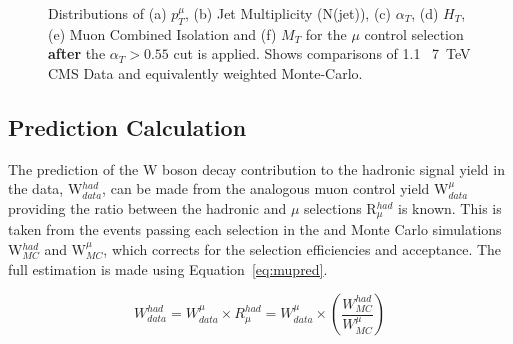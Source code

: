 \begin{figure}[htbp]
\begin{center}
\begin{minipage}[b]{1.\linewidth}
\end{minipage}
\caption{\label{fig:muonplots_afterat} Distributions of (a) $p_{T}^{\mu}$, (b) Jet Multiplicity (N(jet)), (c) $\alpha_{T}$, (d) $H_{T}$, (e) Muon Combined Isolation and (f) $M_{T}$ for the $\mu$ control selection \textbf{after} the $\alpha_{T} > 0.55$ cut is applied. Shows comparisons of 1.1~ 7~TeV CMS Data and equivalently weighted Monte-Carlo.}
\label{fig:kinafter}
\end{center}
\end{figure}
\subsection{Prediction Calculation}

The prediction of the W boson decay contribution to the hadronic signal yield in the data, W$^{had}_{data}$, can be made from the analogous muon control yield W$^{\mu}_{data}$ providing the ratio between the hadronic and $\mu$ selections R$^{had}_{\mu}$ is known. This is taken from the events passing each selection in the \ttj and \wj Monte Carlo simulations W$^{had}_{MC}$ and W$^{\mu}_{MC}$, which corrects for the selection efficiencies and acceptance. The full estimation is made using Equation~\ref{eq:mupred}.

\begin{equation}
W^{had}_{data} = W^{\mu}_{data}\times R^{had}_{\mu} = W^{\mu}_{data}\times (\frac{W^{had}_{MC}}{W^{\mu}_{MC}})
\label{eq:mupred}
\end{equation}


